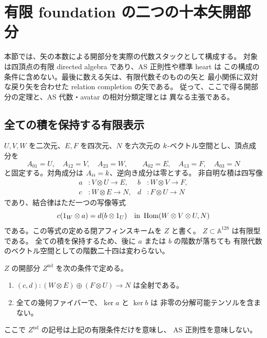 \section{有限 foundation の二つの十本矢開部分}
\label{sec:qa-finite-foundations}

本節では、矢の本数による開部分を実際の代数スタックとして構成する。
対象は四頂点の有限 directed algebra であり、AS 正則性や標準 heart は
この構成の条件に含めない。最後に数える矢は、有限代数そのものの矢と
最小関係に双対な戻り矢を合わせた relation completion の矢である。
従って、ここで得る開部分の定理と、AS 代数・avatar の相対分類定理とは
異なる主張である。

\subsection{全ての積を保持する有限表示}

\(U,V,W\) を二次元、\(E,F\) を四次元、\(N\) を六次元の
\(k\)-ベクトル空間とし、頂点成分を
\[
 A_{01}=U,\quad A_{12}=V,\quad A_{23}=W,\qquad
 A_{02}=E,\quad A_{13}=F,\quad A_{03}=N
\]
と固定する。対角成分は \(A_{ii}=k\)、逆向き成分は零とする。
非自明な積は四写像
\[
 \begin{aligned}
 a&:V\otimes U\longrightarrow E,&
 b&:W\otimes V\longrightarrow F,\\
 c&:W\otimes E\longrightarrow N,&
 d&:F\otimes U\longrightarrow N
 \end{aligned}
\]
であり、結合律はただ一つの写像等式
\begin{equation}
 c(1_W\otimes a)=d(b\otimes1_U)
 \quad\text{in }\operatorname{Hom}(W\otimes V\otimes U,N)
 \label{eq:qa-associativity}
\end{equation}
である。この等式の定める閉アフィンスキームを \(Z\) と書く。
\(Z\subset\mathbb A^{128}\) は有限型である。
全ての積を保持するため、後に \(a\) または \(b\) の階数が落ちても
有限代数のベクトル空間としての階数二十四は変わらない。

\begin{definition}
\label{def:qa-foundation-open}
\(Z\) の開部分 \(Z^{\mathrm{nd}}\) を次の条件で定める。
\begin{enumerate}
\item \((c,d): (W\otimes E)\oplus(F\otimes U)\to N\) は全射である。
\item 全ての幾何ファイバーで、\(\ker a\) と \(\ker b\) は
非零の分解可能テンソルを含まない。
\end{enumerate}
ここで \(Z^{\mathrm{nd}}\) の記号は上記の有限条件だけを意味し、
AS 正則性を意味しない。
\end{definition}

